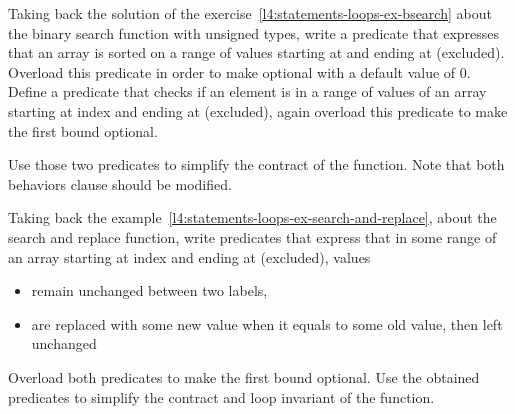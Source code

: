 \label{l4:acsl-properties-predicates-ex-bsearch}


Taking back the solution of the
exercise~\ref{l4:statements-loops-ex-bsearch} about the binary search function
with unsigned types, write a predicate that expresses that an array is sorted on
a range of values starting at  and ending at 
(excluded). Overload this predicate in order to make  optional
with a default value of $0$. Define a predicate that checks if an element is in
a range of values of an array starting at index  and ending at
 (excluded), again overload this predicate to make the first
bound optional.

Use those two predicates to simplify the contract of the function. Note that
both behaviors  clause should be modified.





Taking back the example~\ref{l4:statements-loops-ex-search-and-replace}, about
the search and replace function, write predicates that express that in some range
of an array starting at index  and ending at 
(excluded), values

\begin{itemize}
\item remain unchanged between two labels,
\item are replaced with some new value when it equals to some old value, then
  left unchanged
\end{itemize}

Overload both predicates to make the first bound optional. Use the obtained
predicates to simplify the contract and loop invariant of the function.
